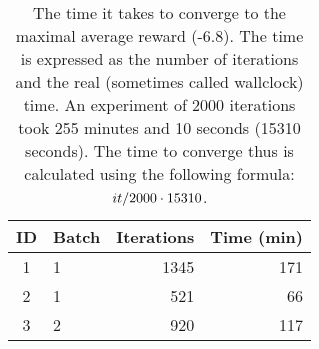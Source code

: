 \begin{table}[htp!]
    \centering
    \caption{The time it takes to converge to the maximal average reward
    (-6.8). The time is expressed as the number of iterations and the real
    (sometimes called wallclock) time. An experiment of 2000 iterations took
    255 minutes and 10 seconds (15310 seconds). The time to converge thus is
    calculated using the following formula: $\protect it / 2000 \cdot 15310$.}
    \label{table:max-reward}
    \begin{tabular}{c|lrr}
        ID & Batch & Iterations & Time (min)\\ \hline
        1 & 1 & 1345 & 171\\
        2 & 1 & 521 & 66\\
        3 & 2 & 920 & 117\\
    \end{tabular}
\end{table}

